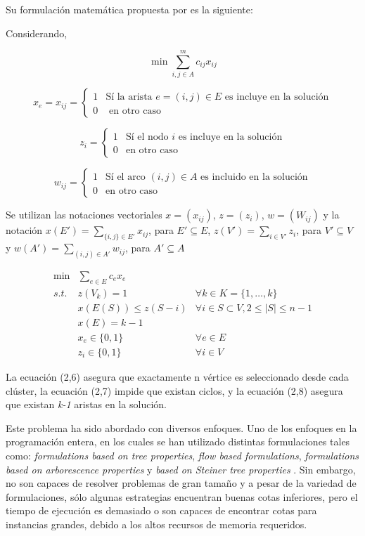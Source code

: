 Su formulación matemática propuesta por \cite{pop2002generalized} es la siguiente:

Considerando,

$$ \min \sum_{i, j \in A}^{m} c_{ij}x_{ij} $$
\vfill

$$
x_e = x_{ij} =
\left\{
\begin{array}{cl}
	1	& \mbox {Sí la arista } e = (i, j) \in E \mbox{ es incluye en la solución}\\
	0	& \mbox{ en otro caso}
\end{array}
\right.
$$

$$
z_i =
\left\{
\begin{array}{cl}
	1	& \mbox {Sí el nodo } i \mbox{ es incluye en la solución}\\
	0	& \mbox{en otro caso}
\end{array}
\right.
$$

$$
w_{ij} =
\left\{
\begin{array}{cl}
	1	& \mbox {Sí el arco } (i, j) \in A \mbox{ es incluido en la solución}\\
	0	& \mbox{en otro caso}
\end{array}
\right.
$$
\vfill

Se utilizan las notaciones vectoriales $ x = (x_{ij})$, $z = (z_i)$, $w = (W_{ij})$ y la notación $x(E') = \sum_{\{i, j\} \in E'} x_{ij}$, para $E' \subseteq E$, $z(V') = \sum_{i \in V'}z_i$, para $V' \subseteq V$ y $w(A') = \sum_{(i, j) \in A'} w_{ij}$, para $A' \subseteq A$
\vfill



\begin{eqnarray}
	\min	& \sum_{e \in E} c_e x_e&\\
	s.t.	& z(V_k) = 1			& \forall k \in K=\{1, \hdots, k\}\\
			& x(E(S)) \leq z(S - i)	& \forall i \in S \subset V, 2 \leq |S| \leq n - 1\\
			& x(E) = k - 1			& \\
			& x_e \in \{0, 1\}		& \forall e \in E\\
			& z_i \in \{0, 1\}		& \forall i \in V\
\end{eqnarray}



La ecuación (2,6) asegura que exactamente n vértice es seleccionado desde cada clúster, la ecuación (2,7) impide que existan ciclos, y la ecuación (2,8) asegura que existan \textit{k-1} aristas en la solución.


Este problema ha sido abordado con diversos enfoques. Uno de los enfoques en la programación entera, en los cuales se han utilizado distintas formulaciones tales como: \textit{formulations based on tree properties},\textit{ flow based formulations}, \textit{formulations based on arborescence properties} y \textit{based on Steiner tree properties} \citep{pop2009survey}. Sin embargo, no son capaces de resolver problemas de gran tamaño y a pesar de la variedad de formulaciones, sólo algunas estrategias encuentran buenas cotas inferiores, pero el tiempo de ejecución es demasiado \citep{ferreira2012grasp} o son capaces de encontrar cotas para instancias grandes, debido a los altos recursos de memoria requeridos.



